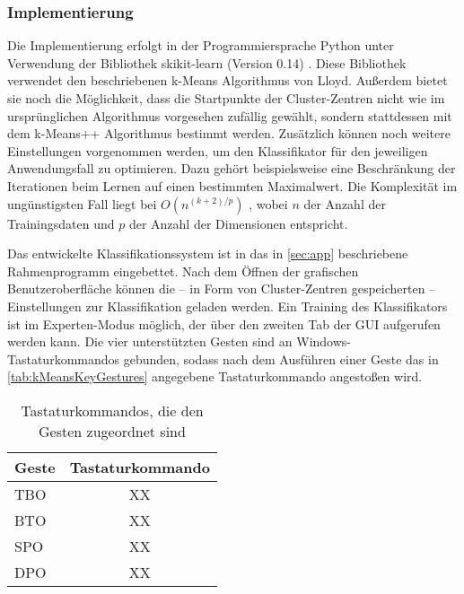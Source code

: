 \subsubsection{Implementierung} \label{subsubsec:kMeansImpl}
Die Implementierung erfolgt in der Programmiersprache Python unter Verwendung der Bibliothek skikit-learn (Version 0.14) \cite{sklearn}. Diese Bibliothek verwendet den beschriebenen k-Means Algorithmus von Lloyd. Außerdem bietet sie noch die Möglichkeit, dass die Startpunkte der Cluster-Zentren nicht wie im ursprünglichen Algorithmus vorgesehen zufällig gewählt, sondern stattdessen mit dem k-Means++ Algorithmus bestimmt werden. Zusätzlich können noch weitere 
Einstellungen vorgenommen werden, um den Klassifikator für den jeweiligen Anwendungsfall  zu optimieren. Dazu gehört beispielsweise eine Beschränkung der Iterationen beim Lernen auf einen bestimmten Maximalwert.
Die Komplexität im ungünstigsten Fall liegt bei $O(n^{(k+2)/p})$ \cite{sklearn.kmeans, kMeansHowSlow}, wobei $n$ der Anzahl der Trainingsdaten und $p$ der Anzahl der Dimensionen entspricht.

Das entwickelte Klassifikationssystem ist in das in \autoref{sec:app} beschriebene Rahmenprogramm eingebettet. Nach dem Öffnen der grafischen Benutzeroberfläche können die -- in Form von Cluster-Zentren gespeicherten --  Einstellungen zur Klassifikation geladen werden. Ein Training des Klassifikators ist im Experten-Modus möglich, der über den zweiten Tab der GUI aufgerufen werden kann. Die vier unterstützten Gesten sind an Windows-Tastaturkommandos gebunden, sodass nach dem Ausführen einer Geste das in \autoref{tab:kMeansKeyGestures} angegebene Tastaturkommando angestoßen wird.

\begin{table}[h]
\centering
\begin{tabular}{|p{}|c|}
\hline
 \textbf{Geste} & \textbf{Tastaturkommando} \\
 \hline
  \ac{TBO} & XX \\
 \hline
  BTO & XX \\
 \hline
  \ac{SPO} & XX \\
 \hline
  \ac{DPO} & XX \\
 \hline
\end{tabular}
\caption[Tastaturkommandos, die den Gesten zugeordnet sind]{Tastaturkommandos, die den Gesten zugeordnet sind}
\label{tab:kMeansKeyGestures}
\end{table}



